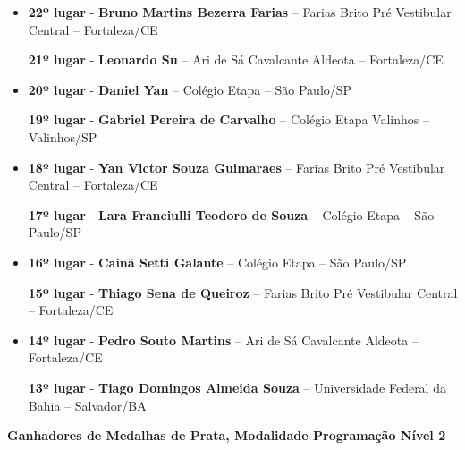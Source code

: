 \documentclass{article}
\begin{document}
\begin{itemize}
\item
\textbf{22º lugar} - \textbf{Bruno Martins Bezerra Farias} – Farias Brito Pré Vestibular Central – Fortaleza/CE


\textbf{21º lugar} - \textbf{Leonardo Su} – Ari de Sá Cavalcante Aldeota – Fortaleza/CE



\item
\textbf{20º lugar} - \textbf{Daniel Yan} – Colégio Etapa – São Paulo/SP


\textbf{19º lugar} - \textbf{Gabriel Pereira de Carvalho} – Colégio Etapa Valinhos – Valinhos/SP



\item
\textbf{18º lugar} - \textbf{Yan Victor Souza Guimaraes} – Farias Brito Pré Vestibular Central – Fortaleza/CE


\textbf{17º lugar} - \textbf{Lara Franciulli Teodoro de Souza} – Colégio Etapa – São Paulo/SP



\item
\textbf{16º lugar} - \textbf{Cainã Setti Galante} – Colégio Etapa – São Paulo/SP


\textbf{15º lugar} - \textbf{Thiago Sena de Queiroz} – Farias Brito Pré Vestibular Central – Fortaleza/CE



\item
\textbf{14º lugar} - \textbf{Pedro Souto Martins} – Ari de Sá Cavalcante Aldeota – Fortaleza/CE


\textbf{13º lugar} - \textbf{Tiago Domingos Almeida Souza} – Universidade Federal da Bahia – Salvador/BA



\end{itemize}

\textbf{\color{blue}Ganhadores de Medalhas de Prata, \color{black}Modalidade Programação Nível 2}
\color{black}
\end{document}
